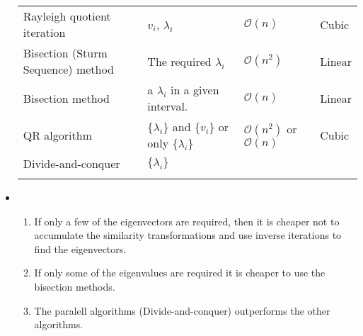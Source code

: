 \documentclass[a4paper,8pt]{beamer} %
\begin{document}
\begin{frame}
\begin{itemize}
\begin{table}
\begin{Tiny}
\begin{tabular}{llll}
							Rayleigh quotient iteration & $v_i$, $\lambda_{i}$ & $\mathcal O(n)$ &	Cubic \\
							Bisection (Sturm Sequence) method 	& The required $\lambda_i$ 	& $\mathcal O(n^2)$ & Linear \\
							Bisection method 		& a $\lambda_i$ in a given interval.	& $\mathcal O(n)$ & Linear \\
							QR algorithm 				& $\{\lambda_i\}$ and $\{v_i\}$ or only $\{\lambda_i\}$ & $\mathcal O(n^2)$ or $\mathcal O(n)$ & Cubic\\
							Divide-and-conquer 			& $\{\lambda_i\}$ 	&  & \\
							\\
							\hline
							\hline
						\end{tabular}
					\end{Tiny}
				\end{table}
			\item 
				\begin{enumerate}
					\item If only a few of the eigenvectors are required, then it is cheaper not to accumulate the similarity 
						transformations and use inverse iterations to find the eigenvectors. 
					\item If only some of the eigenvalues are required it is cheaper to use the bisection methods.
					\item The paralell algorithms (Divide-and-conquer) outperforms the other algorithms. 
				\end{enumerate}
		\end{itemize}
\end{frame}%
\end{document}
